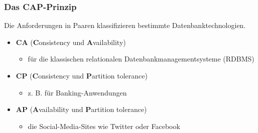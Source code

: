 \documentclass{beamer} %
\begin{document}
\begin{frame}
\frametitle{Das CAP-Prinzip}
Die Anforderungen in Paaren klassifizieren bestimmte Datenbanktechnologien.\newline
\begin{itemize}
\item  \textbf{CA} (\textbf{C}onsistency und \textbf{A}vailability)
\begin{itemize}
\item für die klassischen relationalen Datenbankmanagementsysteme (RDBMS)\newline
\end{itemize}

\item  \textbf{CP} (\textbf{C}onsistency und \textbf{P}artition tolerance)
\begin{itemize}
\item z. B. für Banking-Anwendungen\newline
\end{itemize}

\item  \textbf{AP} (\textbf{A}vailability und \textbf{P}artition tolerance)
\begin{itemize}
\item die Social-Media-Sites wie Twitter oder Facebook 
\end{itemize}

\end{itemize}

\end{frame}

%
%
%
\end{document}
